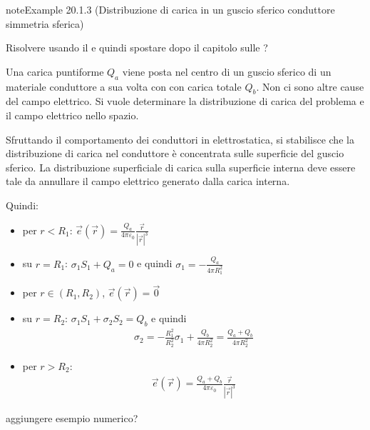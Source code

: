 \documentclass[letterpaper,10pt,italian]{jupyterBook}
\begin{document}
\begin{sphinxadmonition}{note}{Example 20.1.3 (Distribuzione di carica in un guscio sferico conduttore \sphinxhyphen{} simmetria sferica)}



\sphinxAtStartPar
{} Risolvere usando il {\hyperref[\detokenize{ch/electromagnetism/electrostatics:physics-hs-electromagnetism-electrostatics-maxwell-gauss}]{}} e quindi spostare dopo il capitolo sulle {\hyperref[\detokenize{ch/electromagnetism/electrostatics:physics-hs-electromagnetism-electrostatics-maxwell}]{}}?

\sphinxAtStartPar
Una carica puntiforme \(Q_a\) viene posta nel centro di un guscio sferico di un materiale conduttore a sua volta con con carica totale \(Q_b\). Non ci sono altre cause del campo elettrico. Si vuole determinare la distribuzione di carica del problema e il campo elettrico nello spazio.

\sphinxAtStartPar
Sfruttando il comportamento dei conduttori in elettrostatica, si stabilisce che la distribuzione di carica nel conduttore è concentrata sulle superficie del guscio sferico. La distribuzione superficiale di carica sulla superficie interna deve essere tale da annullare il campo elettrico generato dalla carica interna.

\sphinxAtStartPar
Quindi:
\begin{itemize}
\item {} 
\sphinxAtStartPar
per \(r < R_1\): \(\vec{e}(\vec{r}) = \frac{Q_a}{4 \pi \varepsilon_0}\frac{\vec{r}}{|\vec{r}|^3} \)

\item {} 
\sphinxAtStartPar
su \(r = R_1\): \(\sigma_1 S_1 + Q_a = 0\) e quindi \(\sigma_1 = -\frac{Q_a}{4 \pi R_1^2}\)

\item {} 
\sphinxAtStartPar
per \(r \in (R_1, R_2)\), \(\vec{e}(\vec{r}) = \vec{0}\)

\item {} 
\sphinxAtStartPar
su \(r = R_2\): \(\sigma_1 S_1 + \sigma_2 S_2 = Q_b\) e quindi
\begin{equation*}
\begin{split}\sigma_2 = - \frac{R_1^2}{R_2^2} \sigma_1 + \frac{Q_b}{4 \pi R_2^2} = \frac{Q_a + Q_b}{4 \pi R_2^2}\end{split}
\end{equation*}
\item {} 
\sphinxAtStartPar
per \(r > R_2\):
\begin{equation*}
\begin{split}\vec{e}(\vec{r}) = \frac{Q_a + Q_b}{4 \pi \varepsilon_0} \frac{\vec{r}}{|\vec{r}|^3}\end{split}
\end{equation*}
\end{itemize}

\sphinxAtStartPar
{} aggiungere esempio numerico?
\end{sphinxadmonition}
\end{document}
